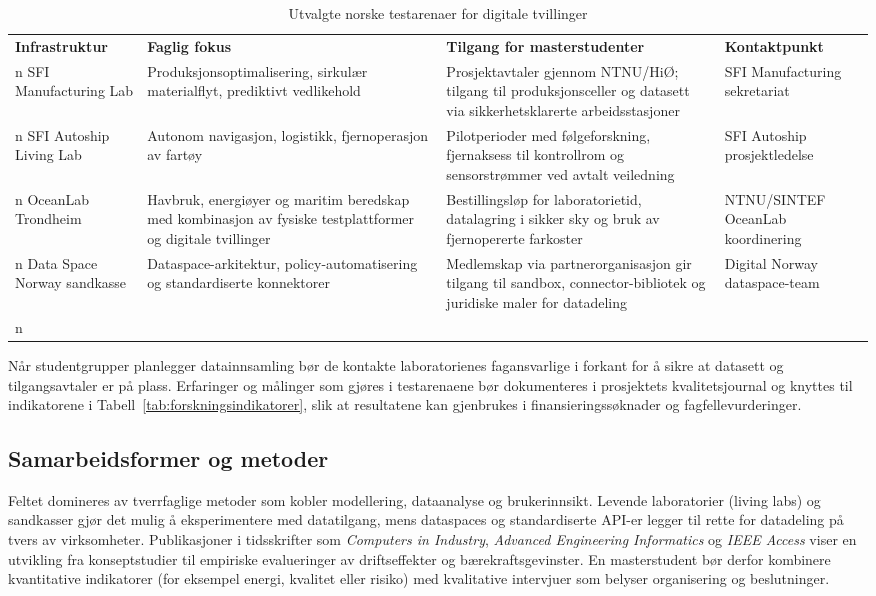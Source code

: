 \begin{table}[h]
    \centering
    \caption{Utvalgte norske testarenaer for digitale tvillinger}
    \label{tab:testarenaer}
    \begin{tabular}{|p{3.2cm}|p{4.6cm}|p{4.4cm}|p{3.0cm}|}
        \hline
        \textbf{Infrastruktur} & \textbf{Faglig fokus} & \textbf{Tilgang for masterstudenter} & \textbf{Kontaktpunkt} \\n        \hline
        SFI Manufacturing Lab & Produksjonsoptimalisering, sirkulær materialflyt, prediktivt vedlikehold & Prosjektavtaler gjennom NTNU/HiØ; tilgang til produksjonsceller og datasett via sikkerhetsklarerte arbeidsstasjoner & SFI Manufacturing sekretariat \citep{sfi_manufacturing2023} \\n        \hline
        SFI Autoship Living Lab & Autonom navigasjon, logistikk, fjernoperasjon av fartøy & Pilotperioder med følgeforskning, fjernaksess til kontrollrom og sensorstrømmer ved avtalt veiledning & SFI Autoship prosjektledelse \citep{sfi_autoship2023} \\n        \hline
        OceanLab Trondheim & Havbruk, energiøyer og maritim beredskap med kombinasjon av fysiske testplattformer og digitale tvillinger & Bestillingsløp for laboratorietid, datalagring i sikker sky og bruk av fjernopererte farkoster & NTNU/SINTEF OceanLab koordinering \citep{sintef2024oceanlab} \\n        \hline
        Data Space Norway sandkasse & Dataspace-arkitektur, policy-automatisering og standardiserte konnektorer & Medlemskap via partnerorganisasjon gir tilgang til sandbox, connector-bibliotek og juridiske maler for datadeling & Digital Norway dataspace-team \citep{digitalnorway2024dataspace} \\n        \hline
    \end{tabular}
\end{table}

Når studentgrupper planlegger datainnsamling bør de kontakte laboratorienes fagansvarlige i forkant for å sikre at datasett og tilgangsavtaler er på plass. Erfaringer og målinger som gjøres i testarenaene bør dokumenteres i prosjektets kvalitetsjournal og knyttes til indikatorene i Tabell~\ref{tab:forskningsindikatorer}, slik at resultatene kan gjenbrukes i finansieringssøknader og fagfellevurderinger.

\subsection{Samarbeidsformer og metoder}
Feltet domineres av tverrfaglige metoder som kobler modellering, dataanalyse og brukerinnsikt. Levende laboratorier (living labs) og sandkasser gjør det mulig å eksperimentere med datatilgang, mens dataspaces og standardiserte API-er legger til rette for datadeling på tvers av virksomheter. Publikasjoner i tidsskrifter som \emph{Computers in Industry}, \emph{Advanced Engineering Informatics} og \emph{IEEE Access} viser en utvikling fra konseptstudier til empiriske evalueringer av driftseffekter og bærekraftsgevinster. En masterstudent bør derfor kombinere kvantitative indikatorer (for eksempel energi, kvalitet eller risiko) med kvalitative intervjuer som belyser organisering og beslutninger.

